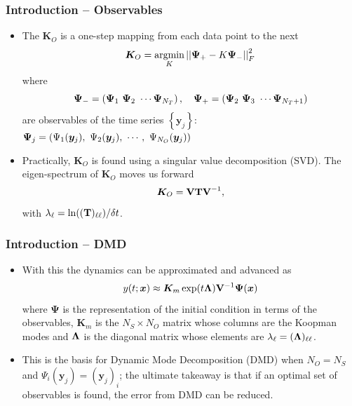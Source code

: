 \documentclass[11pt,aspectratio=169]{beamer}
\newcommand{\norm}[1]{\left|\left|#1\right|\right|}
\newcommand{\parens}[1]{\left(#1\right)}
\newcommand{\bracks}[1]{\left\{#1\right\}}
\begin{document}
    \begin{frame}
        \frametitle{Introduction -- Observables}
        \begin{itemize}
            \item 
            The $\boldsymbol{K}_O$ is a one-step mapping from each data point
            to the next
            \begin{equation}
                \boldsymbol{K}_O = \underset{K}{\text{argmin}}\norm{{\bf\Psi}_+ - K{\bf\Psi}_-}_F^2
            \end{equation}
            where
            \begin{equation}
                {\bf\Psi}_- = \parens{{\bf \Psi}_1\ {\bf \Psi}_2\ \cdots {\bf \Psi}_{N_T}},\quad {\bf\Psi}_+ = \parens{
                {\bf \Psi}_2\ {\bf \Psi}_3\ \cdots {\bf \Psi}_{N_T+1}} 
            \end{equation}
            are observables of the time series $\bracks{\boldsymbol{y}_j}$: ${\bf \Psi}_j = 
            \parens{\Psi_1(\boldsymbol{y}_j),\ \Psi_2(\boldsymbol{y}_j),\ \cdots,\ \Psi_{N_O}(\boldsymbol{y}_j)}$
            \item
            Practically, $\boldsymbol{K}_O$ is found
            using a singular value decomposition (SVD). 
            The eigen-spectrum of $\boldsymbol{K}_O$ moves us forward
            \begin{equation}
                \boldsymbol{K}_O = {\bf VTV}^{-1}, 
            \end{equation}
            with $\lambda_\ell = \ln(({\bf T})_{\ell\ell})/\delta t$.
        \end{itemize}
    \end{frame}

    \begin{frame}
        \frametitle{Introduction -- DMD}
        \begin{itemize}
            \item 
            With this the dynamics can be approximated and advanced as 
            \begin{equation}
                y(t;\boldsymbol{x}) \approx \boldsymbol{K}_m\exp(t{\bf\Lambda}){\bf V}^{-1}\boldsymbol{\Psi}(\boldsymbol{x}) 
            \end{equation}
            where $\boldsymbol{\Psi}$ is the representation of the initial condition in terms of the observables, 
            $\boldsymbol{K}_m$ is the $N_S \times N_O$ matrix whose columns are the Koopman modes 
            and ${\bf \Lambda}$ is the diagonal matrix whose elements are $\lambda_\ell
            = ({\bf \Lambda})_{\ell\ell}$.

            \vspace{1cm}

            \item
            This is the basis for Dynamic Mode Decomposition (DMD) when $N_O = N_S$ 
            and $\Psi_i(\boldsymbol{y}_j) = \parens{\boldsymbol{y}_j}_i$; the
            ultimate takeaway is that if an optimal set of observables is found, 
            the error from DMD can be reduced.
        \end{itemize}
    \end{frame}
\end{document}
